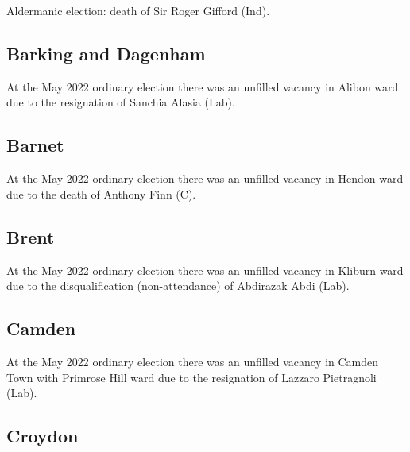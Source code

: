 \documentclass[a4paper,openany]{book}
\begin{document}
\begin{resultsiii}
Aldermanic election: death of Sir Roger Gifford (Ind).

%
\subsection*{Barking and Dagenham}

At the May 2022 ordinary election there was an unfilled vacancy in Alibon ward due to the resignation of Sanchia Alasia (Lab).%

\subsection*{Barnet}

At the May 2022 ordinary election there was an unfilled vacancy in Hendon ward due to the death of Anthony Finn (C).%

\subsection*{Brent}

At the May 2022 ordinary election there was an unfilled vacancy in Kliburn ward due to the disqualification (non-attendance) of Abdirazak Abdi (Lab).%

\subsection*{Camden}

At the May 2022 ordinary election there was an unfilled vacancy in Camden Town with Primrose Hill ward due to the resignation of Lazzaro Pietragnoli (Lab).%

\subsection*{Croydon}


\end{resultsiii}
\end{document}
